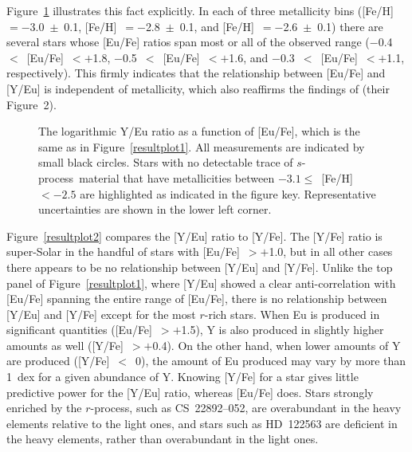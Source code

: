 \documentclass{emulateapj}
\def\rpro{\mbox{$r$-process}}
\def\spro{\mbox{$s$-process}}
\begin{document}
Figure~\ref{resultplot3} illustrates this fact explicitly.
In each of three metallicity bins
([Fe/H]~$= -$3.0~$\pm$~0.1, 
 [Fe/H]~$= -$2.8~$\pm$~0.1, and
 [Fe/H]~$= -$2.6~$\pm$~0.1)
there are several stars whose [Eu/Fe] ratios span most or all of
the observed range
($-$0.4~$<$~[Eu/Fe]~$< +$1.8, 
$-$0.5~$<$~[Eu/Fe]~$< +$1.6, and
$-$0.3~$<$~[Eu/Fe]~$< +$1.1, respectively).
This firmly indicates that the relationship between 
[Eu/Fe] and [Y/Eu] is independent of metallicity,
which also reaffirms the findings of \citet{montes07}
(their Figure~2).

\begin{figure}
\begin{center}
\end{center}
\caption{
\label{resultplot3}
The logarithmic Y/Eu ratio as a function of [Eu/Fe], 
which is the same as in Figure~\ref{resultplot1}.
All measurements are indicated by small black circles.
Stars with no detectable trace of \spro\ material
that have metallicities between $-3.1 \leq$~[Fe/H]~$< -2.5$
are highlighted as indicated in the figure key.
Representative uncertainties are shown 
in the lower left corner.
}
\end{figure}

Figure~\ref{resultplot2} compares the [Y/Eu] ratio to [Y/Fe].
The [Y/Fe] ratio is super-Solar in the handful of stars
with [Eu/Fe]~$> +$1.0, but
in all other cases there appears to be no relationship between
[Y/Eu] and [Y/Fe].
Unlike the top panel of Figure~\ref{resultplot1}, where
[Y/Eu] showed a clear anti-correlation with [Eu/Fe]
spanning the entire range of [Eu/Fe],
there is no relationship between [Y/Eu] and [Y/Fe] except
for the most $r$-rich stars.
When Eu is produced in significant quantities
([Eu/Fe]~$> +$1.5), Y is also produced
in slightly higher amounts as well ([Y/Fe]~$> +$0.4).
On the other hand, when lower amounts of Y are produced 
([Y/Fe]~$<$~0), the amount of Eu produced may vary 
by more than 1~dex for a given abundance of Y.
Knowing [Y/Fe] for a star gives little predictive power 
for the [Y/Eu] ratio, whereas [Eu/Fe] does.
Stars strongly enriched by the \rpro, such as \mbox{CS~22892--052},
are overabundant in the heavy elements relative to the light ones, and 
stars such as \mbox{HD~122563} are deficient in the heavy elements,
rather than overabundant in the light ones.
\end{document}
